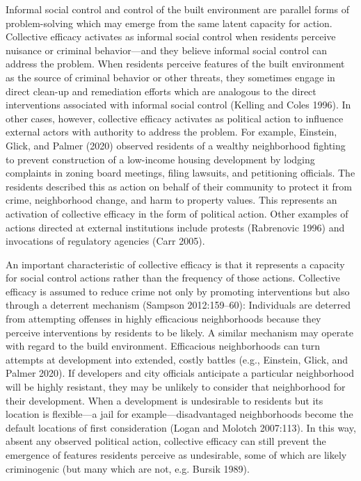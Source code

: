 \documentclass [11pt, proquest] {uwthesis}[2015/03/03]
\begin{document}
Informal social control and control of the built environment are parallel forms of problem-solving which may emerge from the same latent capacity for action. Collective efficacy activates as informal social control when residents perceive nuisance or criminal behavior---and they believe informal social control can address the problem. When residents perceive features of the built environment as the source of criminal behavior or other threats, they sometimes engage in direct clean-up and remediation efforts which are analogous to the direct interventions associated with informal social control (Kelling and Coles 1996). In other cases, however, collective efficacy activates as political action to influence external actors with authority to address the problem. For example, Einstein, Glick, and Palmer (2020) observed residents of a wealthy neighborhood fighting to prevent construction of a low-income housing development by lodging complaints in zoning board meetings, filing lawsuits, and petitioning officials. The residents described this as action on behalf of their community to protect it from crime, neighborhood change, and harm to property values. This represents an activation of collective efficacy in the form of political action. Other examples of actions directed at external institutions include protests (Rabrenovic 1996) and invocations of regulatory agencies (Carr 2005).

An important characteristic of collective efficacy is that it represents a capacity for social control actions rather than the frequency of those actions. Collective efficacy is assumed to reduce crime not only by promoting interventions but also through a deterrent mechanism (Sampson 2012:159--60): Individuals are deterred from attempting offenses in highly efficacious neighborhoods because they perceive interventions by residents to be likely. A similar mechanism may operate with regard to the build environment. Efficacious neighborhoods can turn attempts at development into extended, costly battles (e.g., Einstein, Glick, and Palmer 2020). If developers and city officials anticipate a particular neighborhood will be highly resistant, they may be unlikely to consider that neighborhood for their development. When a development is undesirable to residents but its location is flexible---a jail for example---disadvantaged neighborhoods become the default locations of first consideration (Logan and Molotch 2007:113). In this way, absent any observed political action, collective efficacy can still prevent the emergence of features residents perceive as undesirable, some of which are likely criminogenic (but many which are not, e.g. Bursik 1989).
\end{document}
